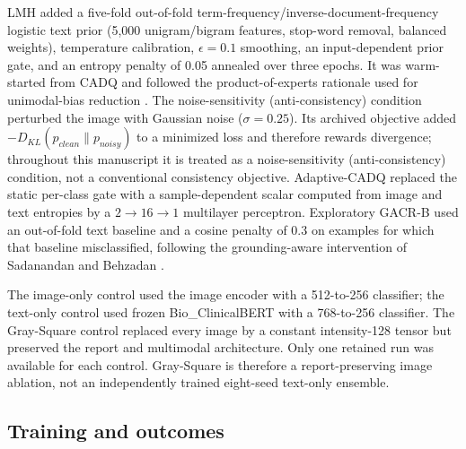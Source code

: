 \documentclass[a4paper,fleqn]{cas-sc}
\begin{document}
LMH added a five-fold out-of-fold term-frequency/inverse-document-frequency
logistic text prior (5,000 unigram/bigram features, stop-word removal, balanced
weights), temperature calibration, $\epsilon=0.1$ smoothing, an input-dependent
prior gate, and an entropy penalty of 0.05 annealed over three epochs. It was
warm-started from CADQ and followed the product-of-experts rationale used for
unimodal-bias reduction \cite{cadene2019rubi}. The noise-sensitivity
(anti-consistency) condition perturbed the
image with Gaussian noise ($\sigma=0.25$). Its archived objective added
$-D_{KL}(p_{clean}\|p_{noisy})$ to a minimized loss and therefore rewards
divergence; throughout this manuscript it is treated as a noise-sensitivity
(anti-consistency) condition, not a conventional consistency objective.
Adaptive-CADQ replaced the static per-class gate with a sample-dependent scalar
computed from image and text entropies by a $2\rightarrow16\rightarrow1$
multilayer perceptron. Exploratory GACR-B used an out-of-fold text baseline and
a cosine penalty of 0.3 on examples for which that baseline misclassified, following
the grounding-aware intervention of Sadanandan and Behzadan
\cite{sadanandan2026consistentdangerous}.

The image-only control used the image encoder with a 512-to-256 classifier; the
text-only control used frozen Bio\_ClinicalBERT with a 768-to-256 classifier.
The Gray-Square control replaced every image by a constant intensity-128 tensor
but preserved the report and multimodal architecture. Only one retained run was
available for each control. Gray-Square is therefore a report-preserving image
ablation, not an independently trained eight-seed text-only ensemble.

\subsection{Training and outcomes}\label{sec:training}
\end{document}
